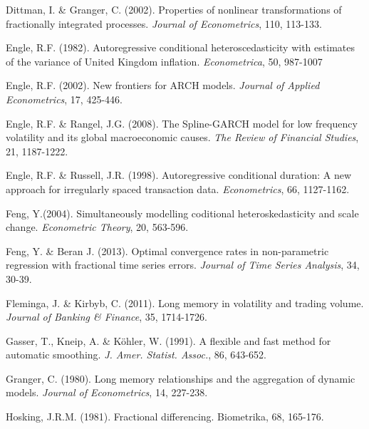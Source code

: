 \documentclass[12pt]{article}
\begin{document}
\begin{description}
\item
Dittman, I. \& Granger, C. (2002). Properties of nonlinear transformations of fractionally integrated processes. \textsl{Journal of Econometrics}, 110, 113-133.

\item
Engle, R.F. (1982). Autoregressive conditional heteroscedasticity with estimates of the variance of United Kingdom inflation. \textsl{Econometrica}, 50, 987-1007

\item
Engle, R.F. (2002). New frontiers for ARCH models. \textsl{Journal of Applied Econometrics},
17, 425-446.

\item
Engle, R.F. \& Rangel, J.G. (2008). The Spline-GARCH model for low frequency volatility and its global macroeconomic causes. \textsl{The Review of Financial Studies}, 21, 1187-1222.


\item
Engle, R.F. \& Russell, J.R. (1998). Autoregressive conditional duration: A new
approach for irregularly spaced transaction data. \textsl{Econometrics}, 66, 1127-1162.

\item
Feng, Y.(2004). Simultaneously modelling coditional heteroskedasticity and scale change. \textsl{Econometric Theory}, 20, 563-596.

\item
Feng, Y. \& Beran J. (2013). Optimal convergence rates in non-parametric regression with fractional time series errors. \textsl{Journal of Time Series Analysis}, 34, 30-39.

\item
Fleminga, J. \& Kirbyb, C. (2011). Long memory in volatility and trading volume. {\it Journal of Banking \& Finance}, 35, 1714-1726.

\item
Gasser, T., Kneip, A. \& K\"{o}hler, W. (1991). A flexible and fast method for automatic smoothing. \textsl{J. Amer. Statist. Assoc.}, 86, 643-652.

\item
Granger, C. (1980). Long memory relationships and the aggregation of dynamic models. \textsl{Journal of Econometrics}, 14, 227-238.

\item
Hosking, J.R.M. (1981). Fractional differencing. Biometrika, 68, 165-176.


\end{description}
\end{document}

